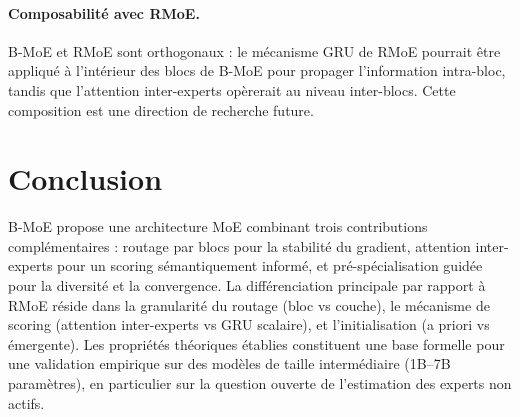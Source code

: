 \documentclass[10pt,a4paper]{article}
\begin{document}
\paragraph{Composabilité avec RMoE.}
B-MoE et RMoE sont orthogonaux : le mécanisme GRU de RMoE pourrait être appliqué à l'intérieur des blocs de B-MoE pour propager l'information intra-bloc, tandis que l'attention inter-experts opèrerait au niveau inter-blocs. Cette composition est une direction de recherche future.

\section{Conclusion}

B-MoE propose une architecture MoE combinant trois contributions complémentaires : routage par blocs pour la stabilité du gradient, attention inter-experts pour un scoring sémantiquement informé, et pré-spécialisation guidée pour la diversité et la convergence. La différenciation principale par rapport à RMoE \cite{qiu2025rmoe} réside dans la granularité du routage (bloc vs couche), le mécanisme de scoring (attention inter-experts vs GRU scalaire), et l'initialisation (a priori vs émergente). Les propriétés théoriques établies constituent une base formelle pour une validation empirique sur des modèles de taille intermédiaire (1B--7B paramètres), en particulier sur la question ouverte de l'estimation des experts non actifs.
\end{document}
